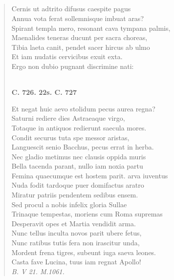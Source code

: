 \documentclass[11pt, a4paper]{report}
\begin{document}
            \subsection*{}
      \begin{verse}
      Cernis ut adtrito difusus caespite pagus \\ Annua vota ferat sollemnisque imbuat aras? \\ Spirant templa mero, resonant cava tympana palmis, \\ Maenalides teneras ducunt per sacra choreas, \\ Tibia laeta canit, pendet sacer hircus ab ulmo \\ Et iam nudatis cervicibus exuit exta. \\ Ergo non dubio pugnant discrimine nati: \\ 
        ﻿\pagebreak 
     \marginpar{[214]}  \marginpar{[01]} \begin{center} \textbf{C. 726. 22s. C. 727} \end{center}Et negat huic aevo stolidum pecus aurea regna? \\ Saturni rediere dies Astraeaque virgo, \\ Totaque in antiquos redierunt saecula mores. \\ Condit securus tuta spe messor aristas, \\ Languescit senio Bacchus, pecus errat in herba. \\ Nec gladio metimus nec clausis oppida muris \\ Bella tacenda parant, nullo iam noxia partu \\ Femina quaecumque est hostem parit. arva iuventus \\ Nuda fodit tardoque puer domifactus aratro \\ Miratur patriis pendentem sedibus ensem. \\ Sed procul a nobis infelix gloria Sullae \\ Trinaque tempestas, moriens cum Roma supremas \\ Desperavit  \lbrack opes \rbrack  et Martia vendidit arma. \\ Nunc tellus inculta novos parit ubere fetus, \\ Nunc ratibus tutis fera non irascitur unda, \\ Mordent frena tigres, subeunt iuga saeva leones. \\ Casta fave Lucina, tuus iam regnat Apollo! \\ \textit{B. V 21. M.1061.} \\ 
      \end{verse}
  
\end{document}
